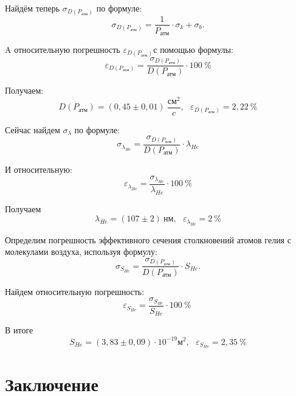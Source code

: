 Найдём теперь $\sigma_{D(P_{\text{атм}})}$ по формуле:
\begin{equation}
	\sigma_{D(P_{\text{атм}})} = \dfrac{1}{P_{\text{атм}}} \cdot \sigma_k + \sigma_b.
\end{equation}

A относительную погрешность $\varepsilon_{D(P_{\text{атм}})}$с помощью формулы:
\begin{equation}
	\varepsilon_{D(P_{\text{атм}})} = \dfrac{\sigma_{D(P_{\text{атм}})}}{D(P_{\text{атм}})}\cdot 100\ \%
\end{equation}

Получаем:
\begin{equation}
	D(P_{\text{атм}}) = (0,45 \pm 0,01)\ \frac{\text{см}^2}{c}, \ ~ \ \varepsilon_{D(P_{\text{атм}})} = 2,22\ \%
\end{equation}

Сейчас найдем $\sigma_{\lambda}$ по формуле:
\begin{equation}
	\sigma_{\lambda_{He}} = \dfrac{\sigma_{D(P_{\text{атм}})}}{D(P_{\text{атм}})} \cdot \lambda_{He}
\end{equation}

И относительную:
\begin{equation}
	\varepsilon_{\lambda_{He}} = \dfrac{\sigma_{\lambda_{He}}}{\lambda_{He}}\cdot 100\ \%
\end{equation}

Получаем
\begin{equation}
	\lambda_{He} = (107 \pm 2)\ \text{нм}, \ ~ \ \varepsilon_{\lambda_{He}} = 2\ \%
\end{equation}


Определим погрешность эффективного сечения столкновений атомов гелия с молекулами воздуха, используя формулу:  
\begin{equation}
	\sigma_{S_{He}} = \dfrac{\sigma_{D(P_{\text{атм}})}}{D(P_{\text{атм}})} \cdot S_{He}.
\end{equation}

Найдем относительную погрешность:
\begin{equation}
	\varepsilon_{S_{He}} = \dfrac{\sigma_{S_{He}}}{S_{He}}\cdot 100\ \%\ 
\end{equation}

В итоге
\begin{equation}
	S_{He} = (3,83 \pm 0,09) \cdot 10^{-19} \text{м}^2,\ ~ \  \varepsilon_{S_{He}} = 2,35\ \%
\end{equation}
\newpage

\section{Заключение}

